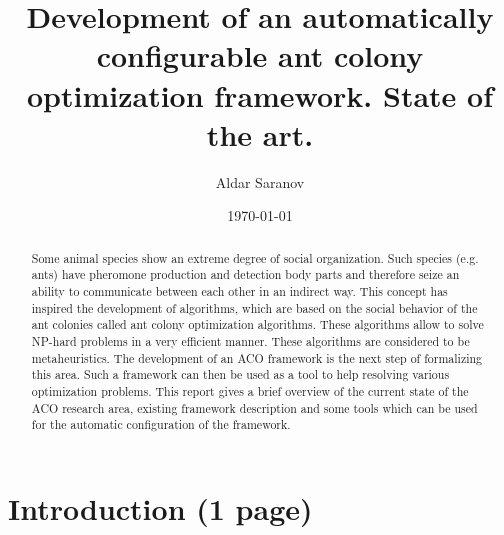 \documentclass[12pt]{article}
\author{Aldar Saranov}
\date{\today}
\title{Development of an automatically configurable ant colony optimization framework. State of the art.}
\begin{document}
\maketitle 
\newpage

\tableofcontents
\newpage

\begin{abstract}
Some animal species show an extreme degree of social organization. Such species (e.g. ants) have pheromone production and detection body parts and therefore seize an ability to communicate between each other in an indirect way. This concept has inspired the development of algorithms, which are based on the social behavior of the ant colonies called ant colony optimization algorithms. These algorithms allow to solve NP-hard problems in a very efficient manner. These algorithms are considered to be metaheuristics. The development of an ACO framework is the next step of formalizing this area. Such a framework can then be used as a tool to help resolving various optimization problems. This report gives a brief overview of the current state of the ACO research area, existing framework description and some tools which can be used for the automatic configuration of the framework.
\end{abstract}




\section{Introduction (1 page)}
\end{document}
